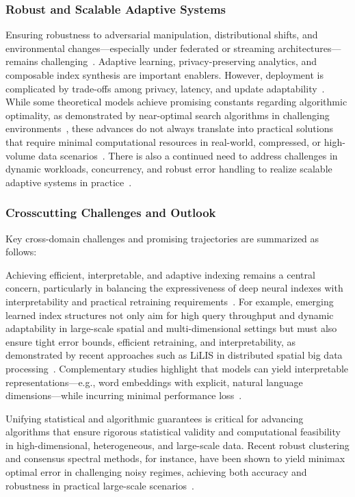 \documentclass[sigconf]{acmart}
\begin{document}
\subsubsection*{Robust and Scalable Adaptive Systems}
Ensuring robustness to adversarial manipulation, distributional shifts, and environmental changes---especially under federated or streaming architectures---remains challenging~\cite{ref107,ref110,ref117,ref118}. Adaptive learning, privacy-preserving analytics, and composable index synthesis are important enablers. However, deployment is complicated by trade-offs among privacy, latency, and update adaptability~\cite{ref110,ref117}. While some theoretical models achieve promising constants regarding algorithmic optimality, as demonstrated by near-optimal search algorithms in challenging environments~\cite{ref107}, these advances do not always translate into practical solutions that require minimal computational resources in real-world, compressed, or high-volume data scenarios~\cite{ref118}. There is also a continued need to address challenges in dynamic workloads, concurrency, and robust error handling to realize scalable adaptive systems in practice~\cite{ref110}.

\subsubsection*{Crosscutting Challenges and Outlook}
Key cross-domain challenges and promising trajectories are summarized as follows:

Achieving efficient, interpretable, and adaptive indexing remains a central concern, particularly in balancing the expressiveness of deep neural indexes with interpretability and practical retraining requirements~\cite{ref110,ref115,ref111}. For example, emerging learned index structures not only aim for high query throughput and dynamic adaptability in large-scale spatial and multi-dimensional settings but must also ensure tight error bounds, efficient retraining, and interpretability, as demonstrated by recent approaches such as LiLIS in distributed spatial big data processing~\cite{ref110,ref111}. Complementary studies highlight that models can yield interpretable representations—e.g., word embeddings with explicit, natural language dimensions—while incurring minimal performance loss~\cite{ref115}.

Unifying statistical and algorithmic guarantees is critical for advancing algorithms that ensure rigorous statistical validity and computational feasibility in high-dimensional, heterogeneous, and large-scale data. Recent robust clustering and consensus spectral methods, for instance, have been shown to yield minimax optimal error in challenging noisy regimes, achieving both accuracy and robustness in practical large-scale scenarios~\cite{ref116,ref117}.
\end{document}
